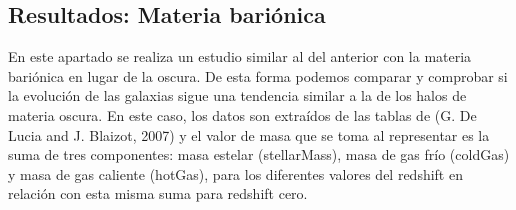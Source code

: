 \begin{comment}
La figura \textit{Figura}~\ref{fig:fig4} presenta el promedio de las masas de los halos para los cinco intervalos de masa de la \textit{Tabla}~\ref{tab:tabla2}. Esta gráfica, refleja un cambio portencual respecto al estado final a redshift cero. Por tanto, para un redhift dado se ve que un cierto halo ha ganado o perdido un cierto porcentaje de su masa final. Cabe esperar que para redshift cercanos al 0, su cambio porcentual sea muy pequeño, es decir, converja al estado final de manera suave. El halo ha llegado a una etapa estable y definida. Si ahora se implementa el concepto de desviación típica con muchos halos con los que promediar, ésta sera mínima para esta etapa final y máxima para el estado inicial. Esto se debe a que cada halo parte con comportamientos másicos muy distintos. Si se observa alguna desviación nula comprendida entre dos momentos de desviacin alta a redshift altos, esto se debe a que únicamente un halo con el que se ha promediado llega a ese redhisft. No quiere decir, por tanto, que todos los halos converjan en ese punto, si no que solo hay uno. \\

Es decir, se interpreta la desviación como la diferencia máxima entre un cambio porcentual de un halo respecto a otro para un redshift determinado. Conforme mayor sea la desviación, más distintos son los comportamientos. Los halos ganan o pierden masa de una manera más arbitraria. Si es materia negra, esto se debe a un intercambio por interacción gravitatoria. Ahota bien, si la desviación se reduce, los halos cambian de manera similar. Son más estables, tendrán menos interacciones. \\

De esta manera, se interpretan mejor las gráficas, resaltando la mala resolución que se produce en los halos de baja masa, cuya desviación es grande de manera continuada. 
\end{comment}

\subsection{Resultados: Materia bariónica}
\label{subsec:2_C}

En este apartado se realiza un estudio similar al del anterior con la materia bariónica en lugar de la oscura. De esta forma podemos comparar y comprobar si la evolución de las galaxias sigue una tendencia similar a la de los halos de materia oscura. En este caso, los datos son extraídos de las tablas de (G. De Lucia and J. Blaizot, 2007) \cite{2} y el valor de masa que se toma al representar es la suma de tres componentes: masa estelar (stellarMass), masa de gas frío (coldGas) y masa de gas caliente (hotGas), para los diferentes valores del redshift en relación con esta misma suma para redshift cero.

